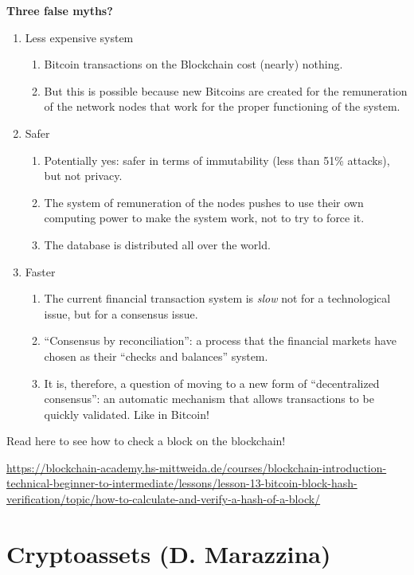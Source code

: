 \textbf{Three false myths?}
\begin{enumerate}
	\item Less expensive system
	      \begin{enumerate}
	      	\item Bitcoin transactions on the Blockchain cost (nearly) nothing.
	      	\item But this is possible because new Bitcoins are created for the remuneration of the network nodes that work for the proper functioning of the system.
	      \end{enumerate}
	\item Safer
	      \begin{enumerate}
	      	\item Potentially yes: safer in terms of immutability (less than 51\% attacks), but not privacy.
	      	\item The system of remuneration of the nodes pushes to use their own computing power to make the system work, not to try to force it.
	      	\item The database is distributed all over the world.
	      \end{enumerate}
	\item Faster
	      \begin{enumerate}
	      	\item The current financial transaction system is \textit{slow} not for a technological issue, but for a consensus issue.
	      	\item ``Consensus by reconciliation'': a process that the financial markets have chosen as their ``checks and balances'' system.
	      	\item It is, therefore, a question of moving to a new form of ``decentralized consensus'': an automatic mechanism that allows transactions to be quickly validated. Like in Bitcoin!
	      \end{enumerate}
\end{enumerate}

Read here to see how to check a block on the blockchain!

\url{https://blockchain-academy.hs-mittweida.de/courses/blockchain-introduction-technical-beginner-to-intermediate/lessons/lesson-13-bitcoin-block-hash-verification/topic/how-to-calculate-and-verify-a-hash-of-a-block/}

\chapter{Cryptoassets (D. Marazzina)}

